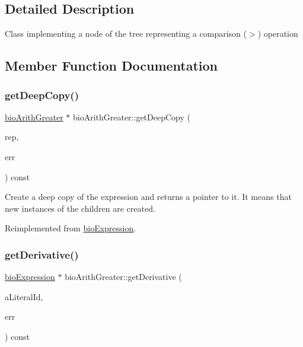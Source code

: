 \subsection{Detailed Description}
Class implementing a node of the tree representing a comparison ($>$) operation 

\subsection{Member Function Documentation}
\mbox{\label{classbio_arith_greater_a39a03806f6465307c2086ce5ae2bed0a}} 
\subsubsection{\texorpdfstring{get\+Deep\+Copy()}{getDeepCopy()}}
{\footnotesize\ttfamily \hyperlink{classbio_arith_greater}{bio\+Arith\+Greater} $\ast$ bio\+Arith\+Greater\+::get\+Deep\+Copy (\begin{DoxyParamCaption}\item[{\hyperlink{classbio_expression_repository}{bio\+Expression\+Repository} $\ast$}]{rep,  }\item[{pat\+Error $\ast$\&}]{err }\end{DoxyParamCaption}) const\hspace{0.3cm}{\ttfamily [virtual]}}

Create a deep copy of the expression and returns a pointer to it. It means that new instances of the children are created. 

Reimplemented from \hyperlink{classbio_expression_a4ee1b8add634078a02eaae26cd40dcc8}{bio\+Expression}.

\mbox{\label{classbio_arith_greater_a20024dcb6e37aadcdfc7e92c58dc2af3}} 
\subsubsection{\texorpdfstring{get\+Derivative()}{getDerivative()}}
{\footnotesize\ttfamily \hyperlink{classbio_expression}{bio\+Expression} $\ast$ bio\+Arith\+Greater\+::get\+Derivative (\begin{DoxyParamCaption}\item[{pat\+U\+Long}]{a\+Literal\+Id,  }\item[{pat\+Error $\ast$\&}]{err }\end{DoxyParamCaption}) const\hspace{0.3cm}{\ttfamily [virtual]}}

